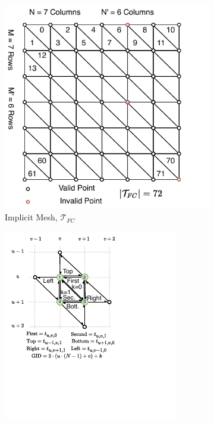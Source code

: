 \vspace{-6pt}
\begin{figure}[H]
  \begin{subfigure}[t]{.33\linewidth}
    \centering\includegraphics[width=.95\linewidth]{chapter_3_polylidar3d/imgs/OPCHalfEdge-OPC-MeshV2.pdf}
    \caption{\label{fig:ch3_OPC_FC}Implicit Mesh, $\mathcal{T}_{FC}$ }\vspace{6pt}
  \end{subfigure}
  \begin{subfigure}[t]{.33\linewidth}
  \centering\includegraphics[trim=0.1cm 1.7cm 1.0cm 0cm,width=.99\linewidth]{chapter_3_polylidar3d/imgs/OPCHalfEdge-HalfEdgeFocusV2.pdf}

\end{subfigure}
\end{figure}
